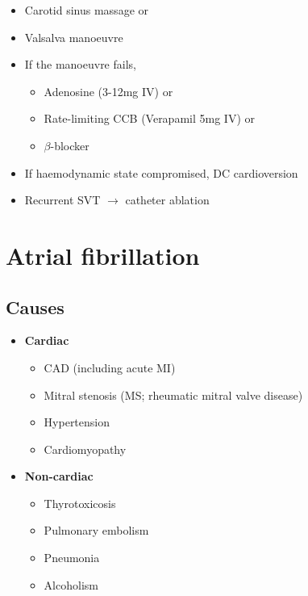 \documentclass[
  12pt,
]{memoir}
\providecommand{\tightlist}{%
  \setlength{\itemsep}{0pt}\setlength{\parskip}{0pt}}
\begin{document}
\begin{itemize}
\tightlist
\item
  Carotid sinus massage or
\item
  Valsalva manoeuvre
\item
  If the manoeuvre fails,

  \begin{itemize}
  \tightlist
  \item
    Adenosine (3-12mg IV) or
  \item
    Rate-limiting CCB (Verapamil 5mg IV) or
  \item
    \(\beta\)-blocker
  \end{itemize}
\item
  If haemodynamic state compromised, DC cardioversion
\item
  Recurrent SVT \(\rightarrow\) catheter ablation
\end{itemize}

\hypertarget{atrial-fibrillation}{%
\section{Atrial fibrillation}\label{atrial-fibrillation}}

\hypertarget{causes}{%
\subsection{Causes}\label{causes}}

\begin{itemize}
\tightlist
\item
  \textbf{Cardiac}

  \begin{itemize}
  \tightlist
  \item
    CAD (including acute MI)
  \item
    Mitral stenosis (MS; rheumatic mitral valve disease)
  \item
    Hypertension
  \item
    Cardiomyopathy
  \end{itemize}
\item
  \textbf{Non-cardiac}

  \begin{itemize}
  \tightlist
  \item
    Thyrotoxicosis
  \item
    Pulmonary embolism
  \item
    Pneumonia
  \item
    Alcoholism
  \end{itemize}
\end{itemize}
\end{document}
